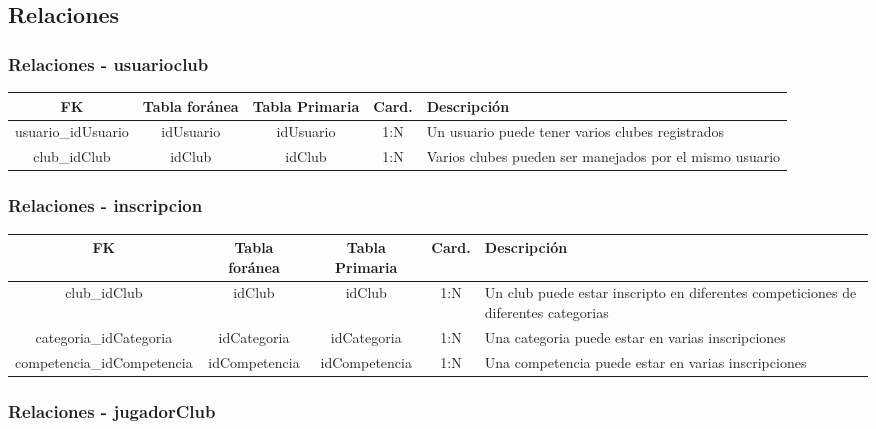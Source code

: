 \subsection{Relaciones}

\subsubsection{Relaciones - usuarioclub}

\begin{table}[H]
	\centering
	\begin{tabularx}{\textwidth}{|c|c|c|c|X|} \hline
		\textbf{FK} & \textbf{Tabla foránea} & \textbf{Tabla Primaria} & \textbf{Card.} & \textbf{Descripción} \\ \hline
		usuario\_idUsuario & idUsuario & idUsuario & 1:N & Un usuario puede tener varios clubes registrados \\ \hline
		club\_idClub & idClub & idClub & 1:N & Varios clubes pueden ser manejados por el mismo usuario \\ \hline
	\end{tabularx}
\end{table}

\subsubsection{Relaciones - inscripcion}

\begin{table}[H]
	\centering
	\begin{tabularx}{\textwidth}{|c|c|c|c|X|} \hline
		\textbf{FK} & \textbf{Tabla foránea} & \textbf{Tabla Primaria} & \textbf{Card.} & \textbf{Descripción} \\ \hline
		club\_idClub & idClub & idClub & 1:N & Un club puede estar inscripto en diferentes competiciones de diferentes categorias \\ \hline
		categoria\_idCategoria & idCategoria & idCategoria & 1:N & Una categoria puede estar en varias inscripciones \\ \hline
		competencia\_idCompetencia & idCompetencia & idCompetencia & 1:N & Una competencia puede estar en varias inscripciones \\ \hline
	\end{tabularx}
\end{table}

\subsubsection{Relaciones - jugadorClub}

